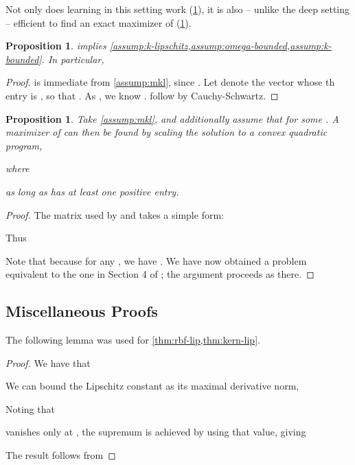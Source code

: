 \documentclass{article}
\newtheorem{prop}[theorem]{Proposition}  \crefname{prop}{Proposition}{Propositions}
\begin{document}
Not only does learning in this setting work (\cref{thm:mkl-lip}),
it is also -- unlike the deep setting -- efficient to find an exact maximizer of  (\cref{prop:mkl-soln}).

\begin{prop} \label{thm:mkl-lip}
     implies \cref{assump:k-lipschitz,assump:omega-bounded,assump:k-bounded}.
    In particular,
    
\end{prop}
\begin{proof}
 is immediate from \cref{assump:mkl}, since .
Let  denote the vector whose th entry is ,
so that .
As , we know .
 follow by Cauchy-Schwartz.
\end{proof}

\begin{prop} \label{prop:mkl-soln}
    Take \cref{assump:mkl},
    and additionally assume that  for some .
    A maximizer of  can then be found
    by scaling the solution to a convex quadratic program,
    
    where
    
    as long as  has at least one positive entry.
\end{prop}
\begin{proof}
The  matrix used by  and  takes a simple form:

Thus

Note that because  for any ,
we have .
We have now obtained a problem equivalent to the one in Section 4 of \citet{Gretton2012NeurIPS};
the argument proceeds as there.
\end{proof}

\subsection{Miscellaneous Proofs} \label{sec:misc-proofs}

The following lemma was used for \cref{thm:rbf-lip,thm:kern-lip}.

\gausslip*
\begin{proof}
    We have that
    
    We can bound the Lipschitz constant as its maximal derivative norm,
    
    Noting that
    
    vanishes only at ,
    the supremum is achieved by
    using that value, giving
    
    The result follows from
    
\end{proof}
\end{document}
